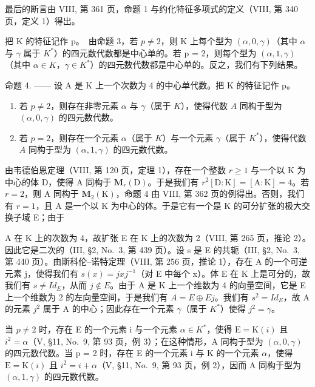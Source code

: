 最后的断言由 VIII, 第 361 页，命题 1 与约化特征多项式的定义（VIII, 第 340 页，定义 1）得出。

把 K 的特征记作 p。~由命题 3，若 \(p \neq 2\)，则 K 上每个型为 \((\alpha, 0, \gamma)\)（其中 \(\alpha\) 与 \(\gamma\) 属于 \(K^{*}\)）的四元数代数都是中心单的。若 p = 2，则每个型为 \((\alpha, 1, \gamma)\)（其中 \(\alpha \in K\)，\(\gamma \in K^{*}\)）的四元数代数都是中心单的。反之，我们有下列结果。

命题 4. —— 设 A 是 K 上一个次数为 4 的中心单代数。把 K 的特征记作 p。

\begin{enumerate}
\def\labelenumi{\alph{enumi})}
\item
  若 \(p \neq 2\)，则存在非零元素 \(\alpha\) 与 \(\gamma\)（属于 \(K\)），使得代数 \(A\) 同构于型为 \((\alpha, 0, \gamma)\) 的四元数代数。
\item
  若 \(p = 2\)，则存在一个元素 \(\alpha\)（属于 \(K\)）与一个元素 \(\gamma\)（属于 \(K^*\)），使得代数 \(A\) 同构于型为 \((\alpha, 1, \gamma)\) 的四元数代数。
\end{enumerate}

由韦德伯恩定理（VIII, 第 120 页，定理 1），存在一个整数 \(r \geqslant 1\) 与一个以 K 为中心的体 D，使得 A 同构于 \(\mathbf{M}_r(\mathrm{D})\)。于是我们有 \(r^2[\mathrm{D}:\mathrm{K}] = [\mathrm{A}:\mathrm{K}] = 4\)。若 \(r = 2\)，则 A 同构于 \(\mathbf{M}_2(\mathrm{K})\)，命题 4 由 VIII, 第 362 页的例得出。否则，我们有 \(r = 1\)，且 A 是一个以 K 为中心的体。于是它有一个是 K 的可分扩张的极大交换子域 E；由于

A 在 K 上的次数为 4，故扩张 E 在 K 上的次数为 2（VIII, 第 265 页，推论 2）。因此它是二次的（III, §2, No.~3, 第 439 页）。设 s 是 E 的共轭（III, §2, No.~3, 第 440 页）。由斯科伦--诺特定理（VIII, 第 256 页，推论 1），存在 A 的一个可逆元素 j，使得我们有 \(s(x) = jxj^{-1}\)（对 E 中每个 x）。体 E 在 K 上是可分的，故我们有 \(s \neq Id_{E}\)，从而 \(j \notin E\)。由于 A 是 K 上一个维数为 4 的向量空间，它是 E 上一个维数为 2 的左向量空间，于是我们有 \(A = E \oplus Ej\)。我们有 \(s^{2} = Id_{E}\)，故 A 的元素 \(j^{2}\) 属于 A 的中心；因此存在一个元素 \(\gamma\)（属于 \(K^{*}\)）使得 \(j^{2} = \gamma\)。

当 \(p \neq 2\) 时，存在 E 的一个元素 i 与一个元素 \(\alpha \in K^{*}\)，使得 \(\mathrm{E} = \mathrm{K}(i)\) 且 \(i^{2} = \alpha\)（V, §11, No.~9, 第 93 页，例 3）；在这种情形，A 同构于型为 \((\alpha, 0, \gamma)\) 的四元数代数。当 p = 2 时，存在 E 的一个元素 i 与 K 的一个元素 \(\alpha\)，使得 \(\mathrm{E} = \mathrm{K}(i)\) 且 \(i^{2} = i + \alpha\)（V, §11, No.~9, 第 93 页，例 2），因而 A 同构于型为 \((\alpha, 1, \gamma)\) 的四元数代数。

